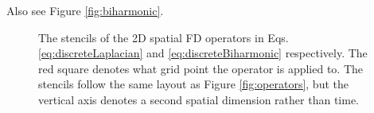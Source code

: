 Also see Figure \ref{fig:biharmonic}.
\begin{figure}[h]
    \centering
    \hspace{0.06\textwidth}
    \caption{The stencils of the 2D spatial FD operators in Eqs. \eqref{eq:discreteLaplacian} and \eqref{eq:discreteBiharmonic} respectively. The red square denotes what grid point the operator is applied to. The stencils follow the same layout as Figure \ref{fig:operators}, but the vertical axis denotes a second spatial dimension rather than time. \label{fig:2Doperators}}
\end{figure}

